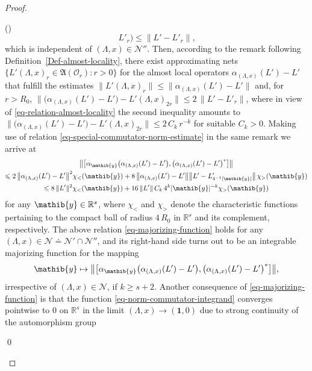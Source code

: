 \documentclass[11pt,twoside,openright]{report}
\theoremstyle{definition}
\theoremstyle{plain}
\theoremstyle{remark}
\theoremstyle{assumption}
\newcommand{\bset}[1]{\bigl\{ #1 \bigr\}}
\newcommand{\bcomm}[2]{\bigl[ #1 , #2 \bigr]}
\newcommand{\abs}[1]{\lvert #1 \rvert}
\newcommand{\norm}[1]{\lVert #1 \rVert}
\newcommand{\bnorm}[1]{\bigl\lVert #1 \bigr\rVert}
\newcommand{\yib}{\mathib{y}}
\newcommand{\Nscr}{\mathscr{N}}
\newcommand{\unit}{\mathbf{1}}
\newcommand{\Rs}{\mathbb{R}^s}
\newcommand{\aLax}{\alpha_{( \Lambda , x )}}
\newcommand{\AOr}{\mathfrak{A} ( \mathscr{O}_r )}
\newcounter{proofitem}
\newenvironment{prooflist}{\begin{list}{(\roman{proofitem})}%
  {\usecounter{proofitem} \setlength{\topsep}{0ex}%
   \setlength{\parsep}{0.2ex} \setlength{\itemsep}{0.4ex}%
   \setlength{\leftmargin}{0em} \setlength{\itemindent}{0.5em}%
   \setlength{\listparindent}{1em}}}{\qed \end{list}}
\begin{document}
\begin{proof}
\begin{prooflist}
\begin{equation*}
{      L'_r \bigr)} \leqslant \norm{L' - L'_r} \text{,}
    \end{equation*}
    which is independent of $( \Lambda ,x ) \in \Nscr''$. Then,
    according to the remark following
    Definition~\ref{Def-almost-locality}, there exist approximating
    nets $\bset{L'( \Lambda , x )_r \in \AOr : r > 0}$ for the almost
    local operators $\aLax ( L' ) - L'$ that fulfill the estimates
    $\norm{L'( \Lambda , x )_r} \leqslant \bnorm{\aLax ( L' ) - L'}$
    and, for $r > R_0$, $\bnorm{\bigl( \aLax ( L' ) - L' \bigr) - L'(
    \Lambda , x )_{2r}} \leqslant 2 \, \norm{L' - L'_r}$, where in
    view of \eqref{eq-relation-almost-locality} the second inequality
    amounts to $\bnorm{\bigl( \aLax ( L' ) - L' \bigr) - L'( \Lambda ,
    x )_{2r}} \leqslant 2 \, C_k \, r^{-k}$ for suitable $C_k >
    0$. Making use of relation
    \eqref{eq-special-commutator-norm-estimate} in the same remark we
    arrive at
    \begin{multline}
      \label{eq-majorizing-function}
      \bnorm{\bcomm{\alpha_\yib \bigl( \aLax ( L' ) - L'
      \bigr)}{\bigl( \aLax ( L' ) - L' \bigr)^*}} \\
      \leqslant 2 \, \bnorm{\aLax ( L' ) - L'}^2 \chi_< ( \yib ) + 8
      \, \bnorm{\aLax ( L' ) - L'} \bnorm{L' - L'_{4^{-1} \abs{\yib}}}
      \, \chi_> ( \yib ) \\
      \leqslant 8 \, \norm{L'}^2 \chi_< (\yib) + 16 \, \norm{L'} \,
      C_k \, 4^k \abs{\yib}^{-k} \chi_> (\yib) 
    \end{multline}
    for any $\yib \in \Rs$, where $\chi_<$ and $\chi_>$ denote the
    characteristic functions pertaining to the compact ball of radius
    $4 \, R_0$ in $\Rs$ and its complement, respectively. The above
    relation \eqref{eq-majorizing-function} holds for any $( \Lambda ,
    x ) \in \Nscr \doteq \Nscr' \cap \Nscr''$, and its right-hand side
    turns out to be an integrable majorizing function for the mapping
    \begin{equation}
      \label{eq-norm-commutator-integrand}
      \yib \mapsto \bnorm{\bcomm{\alpha_\yib \bigl( \aLax ( L' ) - L'
      \bigr)}{\bigl( \aLax ( L' ) - L' \bigr)^*}} \text{,}
    \end{equation}
    irrespective of $( \Lambda , x ) \in \Nscr$, if $k \geqslant s +
    2$. Another consequence of \eqref{eq-majorizing-function} is that
    the function \eqref{eq-norm-commutator-integrand} converges
    pointwise to 0 on $\Rs$ in the limit $( \Lambda , x ) \rightarrow
    ( \unit , 0 )$ due to strong continuity of the automorphism group

\end{prooflist}
\end{proof}
\end{document}
